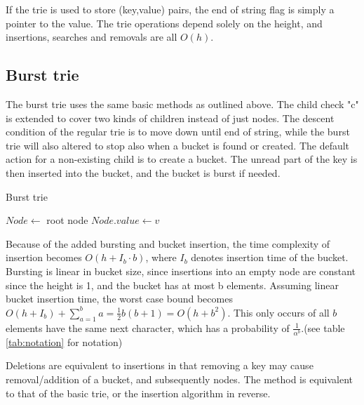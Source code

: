 If the trie is used to store (key,value) pairs, the end of string flag is
simply a pointer to the value. The trie operations depend solely on the height,
and insertions, searches and removals are all $O(h)$.

\subsection{Burst trie}
The burst trie uses the same basic methods as outlined above. The child check
"c" is extended to cover two kinds of children instead of just nodes. The
descent condition of the regular trie is to move down until end of string, while
the burst trie will also altered to stop also when a bucket is found or created.
The default action for a non-existing child is to create a bucket. The unread part
of the key is then inserted into the bucket, and the bucket is burst if needed.

\begin{algorithm}[H]
    \caption{Burst trie }
    \label{alg:bt_insert}


    $Node \leftarrow$  root node\;
    $Node.value \leftarrow v$\;
\end{algorithm}

Because of the added bursting and bucket insertion, the time complexity of
insertion becomes $O(h+I_b\cdot b)$, where $I_b$ denotes insertion time of the
bucket. Bursting is linear in bucket size, since insertions into an empty node
are constant since the height is 1, and the bucket has at most b elements.
Assuming linear bucket insertion time, the worst case bound becomes
$O(h+I_b) + \sum_{a=1}^b a = \frac{1}{2}b(b+1) = O(h+b^2)$.
This only occurs of all $b$ elements have the same next character, which has a
probability of $\frac{1}{\alpha^b}$.(see table \ref{tab:notation} for notation)

Deletions are equivalent to insertions in that removing a key may cause
removal/addition of a bucket, and subsequently nodes. The method is equivalent
to that of the basic trie, or the insertion algorithm in reverse.

